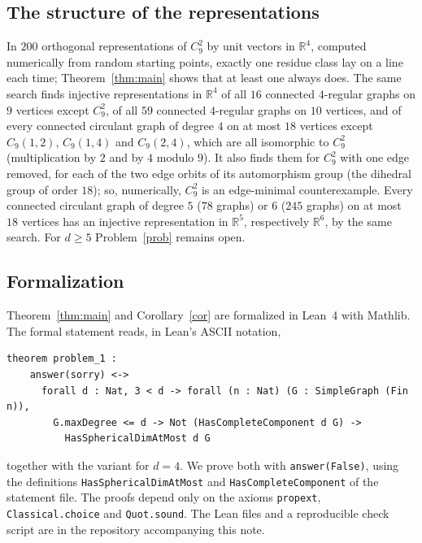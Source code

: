\documentclass[11pt]{amsart}
\theoremstyle{definition}
\theoremstyle{remark}
\newcommand{\R}{\mathbb{R}}
\newcommand{\lean}[1]{\texttt{#1}}
\begin{document}
\subsection*{The structure of the representations}
In $200$ orthogonal representations of $C_9^2$ by unit vectors in $\R^4$, computed numerically from random starting points, exactly one residue class lay on a line each time; Theorem~\ref{thm:main} shows that at least one always does.
The same search finds injective representations in $\R^4$ of all $16$ connected $4$-regular graphs on $9$ vertices except $C_9^2$, of all $59$ connected $4$-regular graphs on $10$ vertices, and of every connected circulant graph of degree $4$ on at most $18$ vertices except $C_9(1,2)$, $C_9(1,4)$ and $C_9(2,4)$, which are all isomorphic to $C_9^2$ (multiplication by $2$ and by $4$ modulo $9$).
It also finds them for $C_9^2$ with one edge removed, for each of the two edge orbits of its automorphism group (the dihedral group of order $18$); so, numerically, $C_9^2$ is an edge-minimal counterexample.
Every connected circulant graph of degree $5$ ($78$ graphs) or $6$ ($245$ graphs) on at most $18$ vertices has an injective representation in $\R^5$, respectively $\R^6$, by the same search.
For $d\ge5$ Problem~\ref{prob} remains open.

\subsection*{Formalization}
Theorem~\ref{thm:main} and Corollary~\ref{cor} are formalized in Lean~4 with Mathlib.
The formal statement \cite{FC} reads, in Lean's ASCII notation,
{\small
\begin{verbatim}
theorem problem_1 :
    answer(sorry) <->
      forall d : Nat, 3 < d -> forall (n : Nat) (G : SimpleGraph (Fin n)),
        G.maxDegree <= d -> Not (HasCompleteComponent d G) ->
          HasSphericalDimAtMost d G
\end{verbatim}
}
together with the variant for $d=4$.
We prove both with \lean{answer(False)}, using the definitions \lean{HasSphericalDimAtMost} and \lean{HasCompleteComponent} of the statement file.
The proofs depend only on the axioms \lean{propext}, \lean{Classical.choice} and \lean{Quot.sound}.
The Lean files and a reproducible check script are in the repository accompanying this note.
\end{document}
